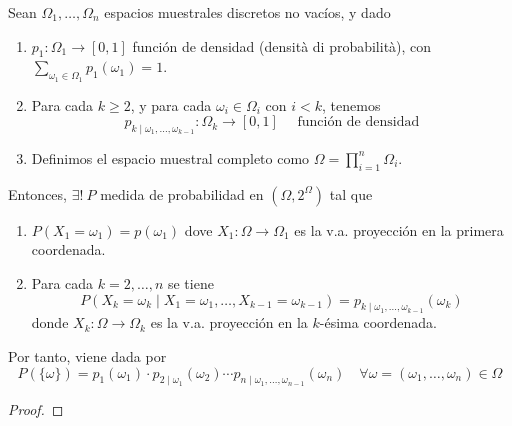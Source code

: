 \begin{teo}
    Sean $\Omega_1, \ldots, \Omega_n$ espacios muestrales discretos no vacíos, y dado 
    \begin{enumerate}
        \item $p_1:\Omega_1 \to [0,1]$ función de densidad (densità di probabilità), con $\sum\limits_{\omega_1 \in \Omega_1} p_1(\omega_1) = 1$.
        \item Para cada $k\geq 2$, y para cada $\omega_i\in \Omega_i$ con $i<k$, tenemos
        \begin{equation*}
            p_{k\mid \omega_1, \ldots, \omega_{k-1}}: \Omega_k \to [0,1] \quad \text{ función de densidad}
        \end{equation*}
        \item Definimos el espacio muestral completo como $\Omega = \prod_{i=1}^n \Omega_i$.
    \end{enumerate}
    Entonces, $\exists! \ P$ medida de probabilidad en $(\Omega, 2^{\Omega})$ tal que
    \begin{enumerate}[label=\alph*)]
        \item $P(X_1=\omega_1)=p(\omega_1)$ dove $X_1:\Omega \to \Omega_1$ es la v.a. proyección en la primera coordenada.
        \item Para cada $k=2, \ldots, n$ se tiene
        \begin{equation*}
            P(X_k = \omega_k \mid X_1=\omega_1, \ldots, X_{k-1}=\omega_{k-1}) = p_{k\mid \omega_1, \ldots, \omega_{k-1}}(\omega_k)
        \end{equation*}
        donde $X_k:\Omega \to \Omega_k$ es la v.a. proyección en la $k$-ésima coordenada.
    \end{enumerate}
    Por tanto, viene dada por 
    \begin{equation*}
        P(\{\omega\})= p_1(\omega_1) \cdot p_{2\mid \omega_1}(\omega_2) \cdots p_{n\mid \omega_1, \ldots, \omega_{n-1}}(\omega_n) \quad \forall \omega=(\omega_1, \ldots, \omega_n) \in \Omega
    \end{equation*}
    \begin{proof}
    \end{proof}
\end{teo}

